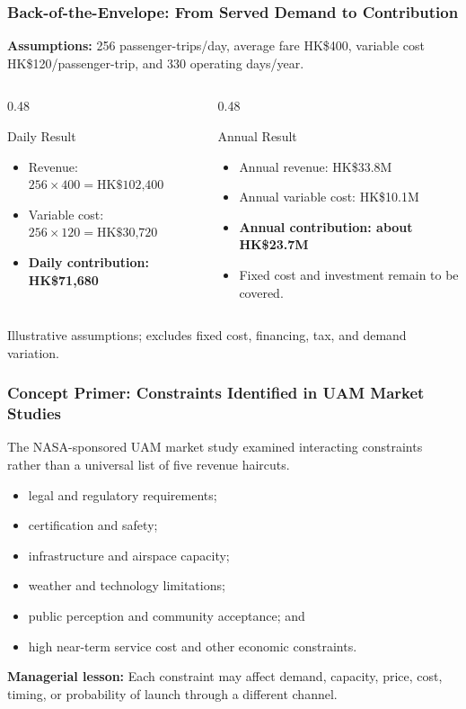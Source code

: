 \documentclass{beamer}
\begin{document}
\begin{frame}[t,shrink=10]
\frametitle{Back-of-the-Envelope: From Served Demand to Contribution}
\textbf{Assumptions:} 256 passenger-trips/day, average fare HK\$400, variable cost HK\$120/passenger-trip, and 330 operating days/year.
\begin{columns}[T]
\begin{column}{0.48\textwidth}\begin{block}{Daily Result}
\begin{itemize}
\item Revenue: $256\times400=\text{HK\$102,400}$
\item Variable cost: $256\times120=\text{HK\$30,720}$
\item \textbf{Daily contribution: HK\$71,680}
\end{itemize}\end{block}\end{column}
\begin{column}{0.48\textwidth}\begin{block}{Annual Result}
\begin{itemize}
\item Annual revenue: HK\$33.8M
\item Annual variable cost: HK\$10.1M
\item \textbf{Annual contribution: about HK\$23.7M}
\item Fixed cost and investment remain to be covered.
\end{itemize}\end{block}\end{column}
\end{columns}
\vfill{\tiny Illustrative assumptions; excludes fixed cost, financing, tax, and demand variation.}
\end{frame}

\begin{frame}[t]
\frametitle{Concept Primer: Constraints Identified in UAM Market Studies}
The NASA-sponsored UAM market study examined interacting constraints rather than a universal list of five revenue haircuts.
\begin{itemize}
\item legal and regulatory requirements;
\item certification and safety;
\item infrastructure and airspace capacity;
\item weather and technology limitations;
\item public perception and community acceptance; and
\item high near-term service cost and other economic constraints.
\end{itemize}
\textbf{Managerial lesson:} Each constraint may affect demand, capacity, price, cost, timing, or probability of launch through a different channel.
\end{frame}
\end{document}
